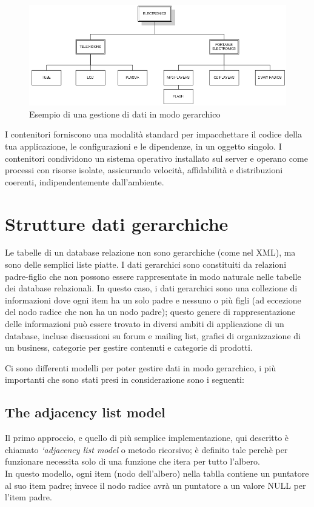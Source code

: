 \begin{figure}[H]
	\includegraphics[scale=0.7]{images/Hierarchical_Data_ex.PNG}
	\caption{Esempio di una gestione di dati in modo gerarchico}
	\label{fig:Hde}
\end{figure}

I contenitori forniscono una modalità standard per impacchettare il codice della tua applicazione, le configurazioni e le dipendenze, 
in un oggetto singolo. I contenitori condividono un sistema operativo installato sul server e operano come processi con risorse isolate, 
assicurando velocità, affidabilità e distribuzioni coerenti, indipendentemente dall’ambiente.

\section{Strutture dati gerarchiche}
Le tabelle di un database relazione non sono gerarchiche (come nel XML), ma sono delle semplici liste piatte. I dati gerarchici sono 
constituiti da relazioni padre-figlio che non possono essere rappresentate in modo naturale nelle tabelle dei database relazionali.
In questo caso, i dati gerarchici sono una collezione di informazioni dove ogni item ha un solo padre e nessuno o più figli
(ad eccezione del nodo radice che non ha un nodo padre); questo genere di rappresentazione delle informazioni può essere trovato in 
diversi ambiti di applicazione di un database, incluse discussioni su forum e mailing list, grafici di organizzazione di un business, 
categorie per gestire contenuti e categorie di prodotti. \\

\newpage

Ci sono differenti modelli per poter gestire dati in modo gerarchico, i più importanti che sono stati presi in considerazione sono i 
seguenti:

\subsection{The adjacency list model}
Il primo approccio, e quello di più semplice implementazione, qui descritto è chiamato \textit{‘adjacency list model} o metodo ricorsivo;
è definito tale perchè per funzionare necessita solo di una funzione che itera per tutto l'albero.\\
In questo modello, ogni item (nodo dell'albero) nella tablla contiene un puntatore al suo item padre; invece il nodo radice avrà un puntatore a un valore
NULL per l'item padre.

